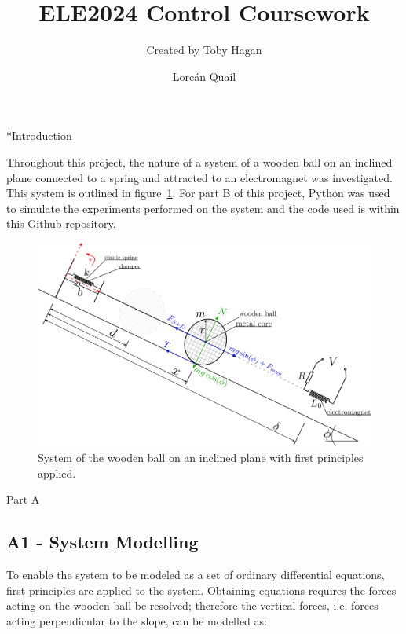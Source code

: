 \documentclass[a4paper,10pt,reqno]{amsart}
\title[ELE2024 Coursework]{\Huge ELE2024 Control Coursework}
\author[T. Hagan]{\Large Created by Toby Hagan}
\author[L. Quail]{\Large Lorcán Quail}
\makeatletter
\def\section{\@startsection{section}{1}%
  \z@{.7\linespacing\@plus\linespacing}{.5\linespacing}%
  {\bfseries\scshape\centering}}
\newenvironment{nouppercase}{%
  \let\uppercase\relax%
  \renewcommand{\uppercasenonmath}[1]{}}{}
\numberwithin{equation}{section}
\makeatother
\begin{document}
\begin{nouppercase}
\maketitle
\end{nouppercase}

\section*{Introduction}

\par Throughout this project, the nature of a system of a wooden ball on an inclined plane connected to a spring and attracted to an electromagnet was investigated. This system is outlined in figure~\ref{fig:A1Diagram}. For part B of this project, Python was used to simulate the experiments performed on the system and the code used is within this \href{https://github.com/Lorcan-Q/Control_Coursework}{Github repository}.

\begin{figure}[h]
 \centering
 \includegraphics[width=0.6\linewidth]{Figures/FreeBody.eps}
 \caption{System of the wooden ball on an inclined plane with first principles applied.}
 \label{fig:A1Diagram}
\end{figure}

\section{Part A}

\subsection{A1 - System Modelling}\label{sec:A1}
To enable the system to be modeled as a set of ordinary differential equations, first principles are applied to the system. Obtaining equations requires the forces acting on the wooden ball be resolved; therefore the vertical forces, i.e. forces acting perpendicular to the slope, can be modelled as:
\end{document}
